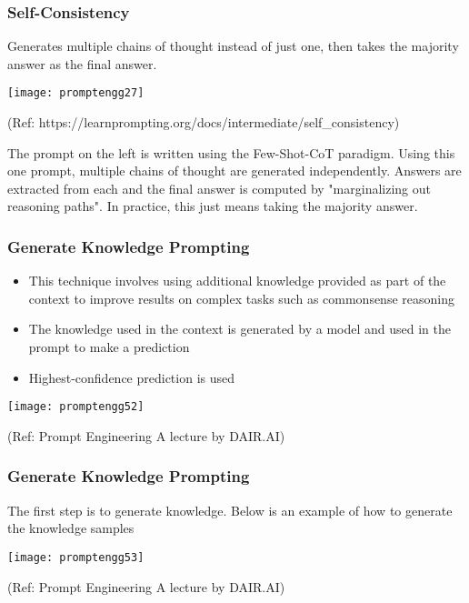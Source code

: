 \begin{frame}[fragile]\frametitle{Self-Consistency}

Generates multiple chains of thought instead of just one, then takes the majority answer as the final answer.

\begin{center}
\texttt{[image: promptengg27]}

{\tiny (Ref: https://learnprompting.org/docs/intermediate/self\_consistency)}

\end{center}		

The prompt on the left is written using the Few-Shot-CoT paradigm. Using this one prompt, multiple chains of thought are generated independently. Answers are extracted from each and the final answer is computed by "marginalizing out reasoning paths". In practice, this just means taking the majority answer.

\end{frame}


\begin{frame}[fragile]\frametitle{Generate Knowledge Prompting}

\begin{itemize}
\item This technique involves using additional knowledge 
provided as part of the context to improve results on 
complex tasks such as commonsense reasoning 
\item The knowledge used in the context is generated by a 
model and used in the prompt to make a prediction 
\item Highest-confidence prediction is used
\end{itemize}	

\begin{center}
\texttt{[image: promptengg52]}

{\tiny (Ref: Prompt Engineering A lecture by DAIR.AI)}

\end{center}	

\end{frame}

\begin{frame}[fragile]\frametitle{Generate Knowledge Prompting}

The first step is to generate knowledge. Below is an 
example of how to generate the knowledge samples

\begin{center}
\texttt{[image: promptengg53]}

{\tiny (Ref: Prompt Engineering A lecture by DAIR.AI)}

\end{center}	

\end{frame}

